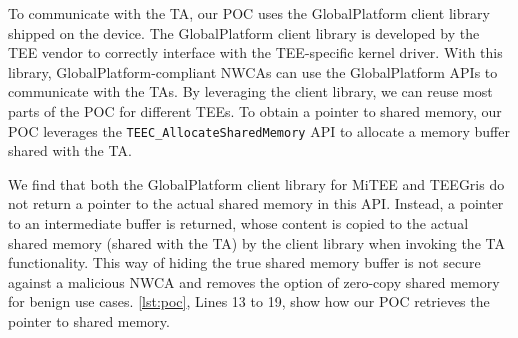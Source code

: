 \documentclass[letterpaper,twocolumn,10pt]{article}
\newcommand{\mitee}{MiTEE\xspace}
\newcommand{\teegris}{TEEGris\xspace}
\begin{document}
To communicate with the TA, our POC uses the GlobalPlatform client library shipped on the device. 
The GlobalPlatform client library is developed by the TEE vendor to correctly interface with 
the TEE-specific kernel driver. With this library, GlobalPlatform-compliant 
NWCAs can use the GlobalPlatform APIs to communicate with the TAs. By leveraging the client library, we can reuse most
parts of the POC for different TEEs. To obtain a pointer to shared memory, our POC 
leverages the \texttt{TEEC\_AllocateSharedMemory} API to allocate a memory buffer 
shared with the TA. 

We find that both the GlobalPlatform client library for \mitee 
and \teegris do not return a pointer to the actual shared memory in this API. 
Instead, a pointer to an intermediate buffer is returned, whose content is copied 
to the actual shared memory (shared with the TA) by the client library when invoking the TA 
functionality. This way of hiding the true shared memory buffer is not secure against a malicious 
NWCA and removes the option of zero-copy shared memory for benign use cases. 
\autoref{lst:poc}, Lines 13 to 19, show how our POC retrieves the pointer to shared memory.



\end{document}
